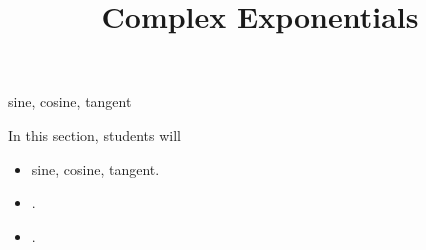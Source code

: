 \documentclass{ximera}
\title{Complex Exponentials}
\begin{document}
\begin{abstract}
%
\end{abstract}
\maketitle




sine, cosine, tangent

\begin{sectionOutcomes}
In this section, students will 

\begin{itemize}
\item sine, cosine, tangent.
\item .
\item .
\end{itemize}
\end{sectionOutcomes}
\end{document}
